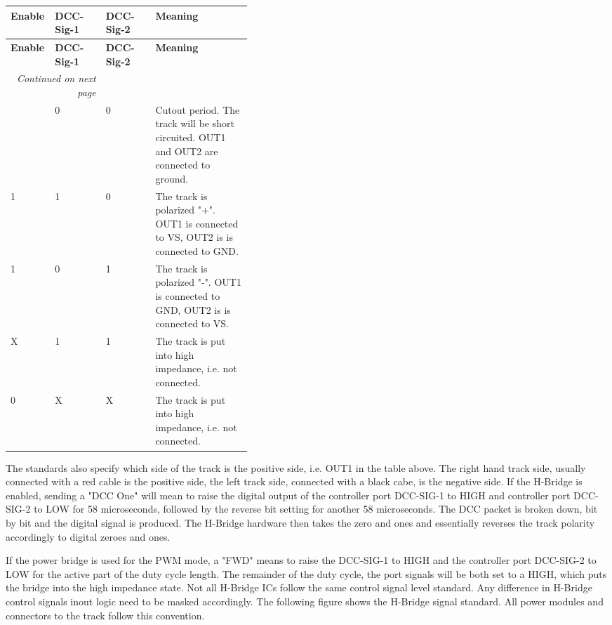\begin{longtable}{@{}|l|l|l|p{0.4\linewidth}|@{}}
    \toprule
    \textbf{Enable} & \textbf{DCC-Sig-1} & \textbf{DCC-Sig-2} & \textbf{Meaning} \\
    \midrule
    \endfirsthead
    \toprule
    \textbf{Enable} & \textbf{DCC-Sig-1} & \textbf{DCC-Sig-2} & \textbf{Meaning} \\
    \midrule
    \endhead
    \midrule
    \multicolumn{2}{r}{\textit{Continued on next page}} \\
    \midrule
    \endfoot
    \bottomrule
    \endlastfoot
    1 & 0 & 0 & Cutout period. The track will be short circuited. OUT1 and OUT2 are connected to ground. \\
    \midrule
    1 & 1 & 0 & The track is polarized "+". OUT1 is connected to VS, OUT2 is is connected to GND. \\
    \midrule
    1 & 0 & 1 & The track is polarized "-". OUT1 is connected to GND, OUT2 is is connected to VS. \\
    \midrule
    X & 1 & 1 & The track is put into high impedance, i.e. not connected. \\
    \midrule
    0 & X & X & The track is put into high impedance, i.e. not connected. \\
\end{longtable}

The standards also specify which side of the track is the positive side, i.e. OUT1 in the table above. The right hand track side, usually connected with a red cable is the positive side, the left track side, connected with a black cabe, is the negative side. If the H-Bridge is enabled, sending a "DCC One" will mean to raise the digital output of the controller port DCC-SIG-1 to HIGH and controller port DCC-SIG-2 to LOW for 58 microseconds, followed by the reverse bit setting for another 58 microseconds. The DCC packet is broken down, bit by bit and the digital signal is produced. The H-Bridge hardware then takes the zero and ones and essentially reverses the track polarity accordingly to digital zeroes and ones.

If the power bridge is used for the PWM mode, a "FWD" means to raise  the DCC-SIG-1 to HIGH and the controller port DCC-SIG-2 to LOW for the active part of the duty cycle length. The remainder of the duty cycle, the port signals will be both set to a HIGH, which puts the bridge into the high impedance state. Not all H-Bridge ICs follow the same control signal level standard. Any difference in H-Bridge control signals inout logic need to be masked accordingly. The following figure shows the H-Bridge signal standard. All power modules and connectors to the track follow this convention.

